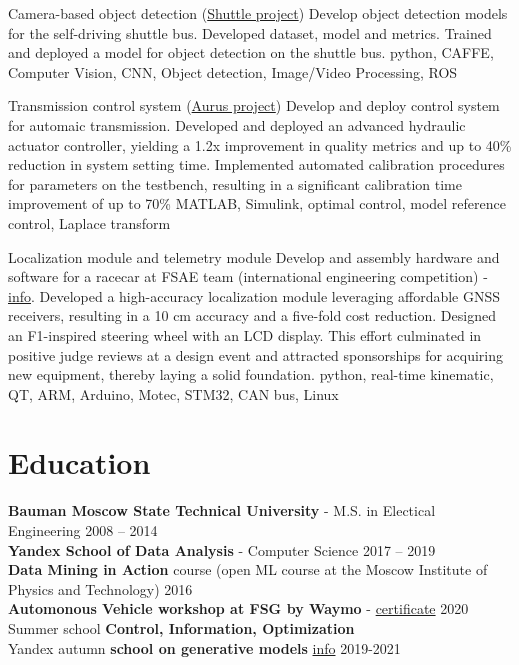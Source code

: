 \documentclass[]{resume}
\begin{document}
\project
{Camera-based object detection  (\href{https://www.engadget.com/2016/08/28/yandex-teams-on-self-driving-shuttle-bus/}{Shuttle project})}
{Develop object detection models for the self-driving shuttle bus.}
{ Developed dataset, model and metrics. Trained and deployed a model for object detection on the shuttle bus.}
{python, CAFFE, Computer Vision, CNN, Object detection, Image/Video Processing, ROS}

\project
{Transmission control system (\href{https://en.wikipedia.org/wiki/Aurus_Senat}{Aurus project})}
{Develop and deploy control system for automaic transmission.}
{Developed and deployed an advanced hydraulic actuator controller, yielding a 1.2x improvement in quality metrics and up to 40\% reduction in system setting time. Implemented automated calibration procedures for parameters on the testbench, resulting in a significant calibration time improvement of up to 70\%}
{MATLAB, Simulink, optimal control, model reference control, Laplace transform}

\project
{Localization module and telemetry module}
{Develop and assembly hardware and software for a racecar  at FSAE team (international engineering competition) - \href{https://baumanracing.ru/en/}{info}.}
{Developed a high-accuracy localization module leveraging affordable GNSS receivers, resulting in a 10 cm accuracy and a five-fold cost reduction. Designed an F1-inspired steering wheel with an LCD display. This effort culminated in positive judge reviews at a design event and attracted sponsorships for acquiring new equipment, thereby laying a solid foundation.}
{python, real-time kinematic, QT, ARM, Arduino, Motec, STM32, CAN bus, Linux}

\section*{\sectionformat Education}
\textbf{Bauman Moscow State Technical University} - M.S. in Electical Engineering \hfill 2008 -- 2014 \\
\textbf{Yandex School of Data Analysis} - Computer Science \hfill 2017 -- 2019 \\
\textbf{Data Mining in Action} course (open ML course at the Moscow Institute of Physics and Technology) \hfill    2016         \\
\textbf{Automonous Vehicle workshop at FSG by Waymo} - \href{https://drive.google.com/file/d/1-WxECccxBrRWIvEt9WQeXKTueiF658r7/view?usp=sharing}{certificate}   \hfill  2020       \\
Summer school \textbf{Control, Information, Optimization} \\
Yandex autumn \textbf{school on generative models} \href{https://indico.cern.ch/event/1082512/timetable/#20211123}{info}                  \hfill  2019-2021
\end{document}
